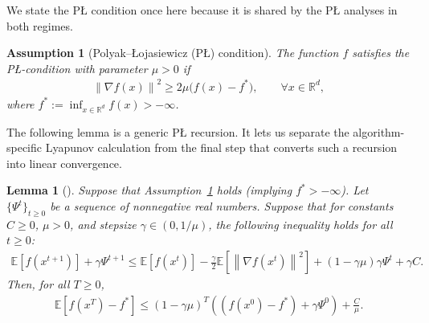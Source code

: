 \documentclass{article}
\newcommand{\bb}{\mathbb}
\newcommand{\R}{\bb R}
\newcommand{\sqn}[1]{\left\| #1 \right\|^2}
\newcommand{\fstar}{f^*}
\newcommand{\eqdef}{:=}
\newcommand{\Exp}[1]{{\bb E}\left[#1\right]}
\theoremstyle{plain}
\newtheorem{assumption}{Assumption}
\newtheorem{lemma}{Lemma}
\begin{document}
We state the P\L{} condition once here because it is shared by the P\L{} analyses in both regimes.

\begin{assumption}[Polyak--\L{}ojasiewicz (P\L) condition]\label{ass:pl_condition}
The function $f$ satisfies the P\L-condition with parameter $\mu>0$ if
\begin{align}
\label{eq:pl_condition}
\sqn{\nabla f(x)} \ge 2\mu\big(f(x)-\fstar\big),\qquad \forall x\in\R^d,
\end{align}
where $\fstar\eqdef \inf_{x\in\R^d} f(x)>-\infty$.
\end{assumption}

The following lemma is a generic P\L{} recursion.
It lets us separate the algorithm-specific Lyapunov calculation from the final step that converts such a recursion into linear convergence.

\begin{lemma}[\citep{dasha23}]
    \label{lemma:good_recursion_pl}
    Suppose that Assumption~\ref{ass:pl_condition} holds (implying $\fstar > -\infty$). Let $\{\Psi^t\}_{t\ge 0}$ be a sequence of nonnegative real numbers. Suppose that for constants $C \geq 0$, $\mu > 0$, and stepsize $\gamma \in (0, 1 / \mu)$, the following inequality holds for all $t \geq 0$:
    \begin{align*}
        \Exp{f(x^{t+1})} + \gamma \Psi^{t+1} \leq \Exp{f(x^t)} - \frac{\gamma}{2}\Exp{\sqn{\nabla f(x^t)}} + (1 - \gamma \mu)\gamma \Psi^{t} + \gamma C.
    \end{align*}
    Then, for all $T \geq 0$,
    \begin{align}
        \label{eq:good_recursion_pl}
        \Exp{f(x^{T}) - \fstar} \leq (1 - \gamma \mu)^{T}\left((f(x^0) - \fstar) + \gamma \Psi^{0}\right) + \frac{C}{\mu}.
    \end{align}
\end{lemma}
\end{document}

